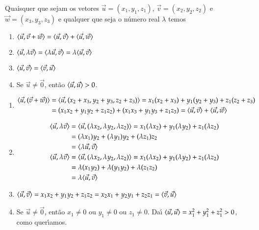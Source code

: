 \begin{proposicao}\label{propriedades-produto-vetorial-espaco}
  Quaisquer que sejam os vetores $\vec{u} = (x_1, y_1,z_1)$, $\vec{v} = (x_2, y_2,z_2)$ e $\vec{w} = (x_3, y_3,z_3)$ e qualquer que seja o n\'umero real $\lambda$ temos
  \begin{enumerate}[label=({\roman*})]
    \item\label{linearidade-soma-produto-vetorial-espaco} $\langle\vec{u}, \vec{v} + \vec{w}\rangle = \langle \vec{u}, \vec{v} \rangle + \langle \vec{u}, \vec{w} \rangle$
    \item\label{linearidade-escalar-produto-vetorial-espaco} $\langle\vec{u}, \lambda\vec{v}\rangle = \langle\lambda\vec{u}, \vec{v}\rangle = \lambda\langle \vec{u}, \vec{v} \rangle$
    \item $\langle \vec{u}, \vec{v} \rangle = \langle \vec{v}, \vec{u} \rangle$
    \item Se $\vec{u} \ne \vec{0}$, ent\~ao $\langle \vec{u}, \vec{u} \rangle > 0$.
  \end{enumerate}
\end{proposicao}
\begin{prova}
  \begin{enumerate}[label=({\roman*})]
    \item \begin{align*}
      \langle\vec{u}, (\vec{v} + \vec{w})\rangle &= \langle\vec{u}, (x_2 + x_3, y_2 + y_3, z_2 + z_3)\rangle = x_1(x_2 + x_3) + y_1(y_2 + y_3) + z_1(z_2+z_3) \\ &= (x_1x_2 + y_1y_2 + z_1z_2) + (x_1x_3 + y_1y_3 + z_1z_3) = \langle \vec{u}, \vec{v} \rangle + \langle \vec{u}, \vec{w} \rangle
    \end{align*}
    \item \begin{align*}
      \langle\vec{u}, \lambda\vec{v}\rangle &= \langle\vec{u}, (\lambda x_2, \lambda y_2, \lambda z_2)\rangle = x_1(\lambda x_2) + y_1(\lambda y_2) + z_1(\lambda z_2)\\ &= (\lambda x_1)y_2 + (\lambda y_1)y_2 + (\lambda z_1)z_2 \\ &= \langle\lambda\vec{u}, \vec{v}\rangle\\
      \langle\vec{u}, \lambda\vec{v}\rangle &= \langle\vec{u}, (\lambda x_2, \lambda y_2, \lambda z_2)\rangle = x_1(\lambda x_2) + y_1(\lambda y_2) + z_1(\lambda z_2)\\ &= \lambda (x_1y_2) + \lambda (y_1y_2) + \lambda(z_1z_2) \\ &= \lambda\langle \vec{u}, \vec{v} \rangle
    \end{align*}
    \item $\langle \vec{u}, \vec{v} \rangle = x_1x_2 + y_1y_2 + z_1z_2 = x_2x_1 + y_2y_1 + z_2z_1 = \langle \vec{v}, \vec{u} \rangle$
    \item Se $\vec{u} \ne \vec{0}$, ent\~ao $x_1 \ne 0$ ou $y_1 \ne 0$ ou $z_1 \ne 0$. Da{\'\i} $\langle \vec{u}, \vec{u} \rangle = x_1^2 + y_1^2 + z_1^2> 0$, como quer{\'\i}amos.
  \end{enumerate}
\end{prova}

